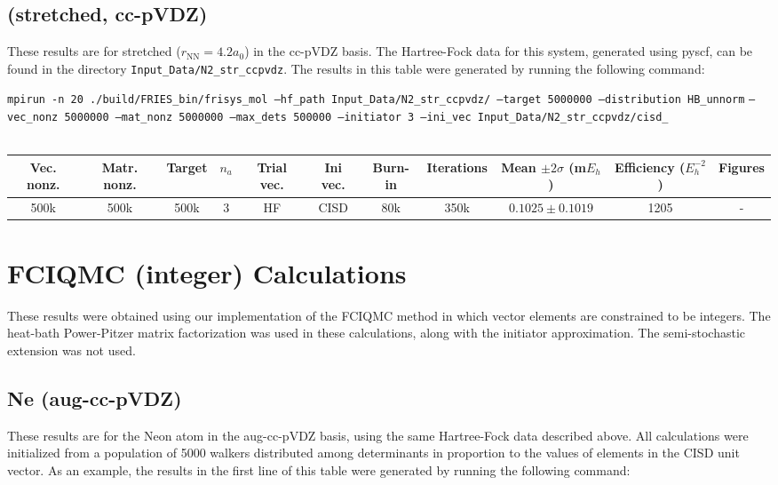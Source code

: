 \documentclass[12pt, landscape]{article}
\begin{document}
\subsection*{ (stretched, cc-pVDZ)}
These results are for stretched  ($r_\text{NN} = 4.2 a_0$) in the cc-pVDZ basis. The Hartree-Fock data for this system, generated using pyscf, can be found in the directory \texttt{Input\_Data/N2\_str\_ccpvdz}. The results in this table were generated by running the following command:

\texttt{mpirun -n 20 ./build/FRIES\_bin/frisys\_mol --hf\_path Input\_Data/N2\_str\_ccpvdz/ --target 5000000 --distribution HB\_unnorm} \texttt{--vec\_nonz 5000000 --mat\_nonz 5000000 --max\_dets 500000 --initiator 3 --ini\_vec Input\_Data/N2\_str\_ccpvdz/cisd\_}
\\~\\
\begin{tabular}{c|c|c|c|c|c|c|c|c|c|c}
Vec. nonz. & Matr. nonz. & Target & $n_a$ & Trial vec. & Ini vec. & Burn-in & Iterations & Mean $\pm 2 \sigma$ (m$E_h$) & Efficiency ($E_h^{-2}$) & Figures \\ \hline
500k & 500k & 500k & 3 & HF & CISD & 80k & 350k & $0.1025 \pm 0.1019$ & 1205 & - \\
\end{tabular}

\section*{FCIQMC (integer) Calculations}
These results were obtained using our implementation of the FCIQMC method in which vector elements are constrained to be integers. The heat-bath Power-Pitzer matrix factorization was used in these calculations, along with the initiator approximation. The semi-stochastic extension was not used.

\subsection*{Ne (aug-cc-pVDZ)}
These results are for the Neon atom in the aug-cc-pVDZ basis, using the same Hartree-Fock data described above. All calculations were initialized from a population of 5000 walkers distributed among determinants in proportion to the values of elements in the CISD unit vector. As an example, the results in the first line of this table were generated by running the following command:
\end{document}
